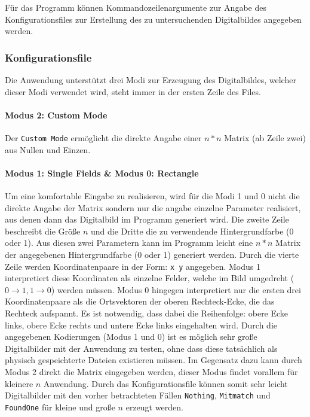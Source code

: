 Für das Programm können Kommandozeilenargumente zur Angabe des Konfigurationsfiles zur Erstellung des zu untersuchenden Digitalbildes angegeben werden.

\subsubsection{Konfigurationsfile}
Die Anwendung unterstützt drei Modi zur Erzeugung des Digitalbildes, welcher dieser Modi verwendet wird, steht immer in der ersten Zeile des Files.
\paragraph{Modus 2: Custom Mode}Der \texttt{Custom Mode} ermöglicht die direkte Angabe einer $n*n$ Matrix (ab Zeile zwei) aus Nullen und Einzen.
\paragraph{Modus 1: Single Fields \& Modus 0: Rectangle}
Um eine komfortable Eingabe zu realisieren, wird für die Modi 1 und 0 nicht die direkte Angabe der Matrix sondern nur die angabe einzelne Parameter realisiert, aus denen dann das Digitalbild im Programm generiert wird.
Die zweite Zeile beschreibt die Größe $n$ und die Dritte die zu verwendende Hintergrundfarbe (0 oder 1). 
Aus diesen zwei Parametern kann im Programm leicht eine $n*n$ Matrix der angegebenen Hintergrundfarbe (0 oder 1) generiert werden.
Durch die vierte Zeile werden Koordinatenpaare in der Form: \texttt{x y} angegeben. Modus 1 interpretiert diese Koordinaten als einzelne Felder, welche im Bild umgedreht \linebreak ($0 \rightarrow 1,1 \rightarrow 0$) werden müssen. 
Modus 0 hingegen interpretiert nur die ersten drei Koordinatenpaare als die Ortsvektoren der oberen Rechteck-Ecke, die das Rechteck aufspannt. 
Es ist notwendig, dass dabei die Reihenfolge: obere Ecke links, obere Ecke rechts und untere Ecke links eingehalten wird.
Durch die angegebenen Kodierungen (Modus 1 und 0) ist es möglich sehr große Digitalbilder mit der Anwendung zu testen, ohne dass diese tatsächlich  als physisch gespeichterte Dateien existieren müssen. 
Im Gegensatz dazu kann durch Modus 2 direkt die Matrix eingegeben werden, dieser Modus findet vorallem für kleinere $n$ Anwendung. 
Durch das Konfigurationsfile können somit sehr leicht Digitalbilder mit den vorher betrachteten Fällen \texttt{Nothing}, \texttt{Mitmatch} und \texttt{FoundOne} für kleine und große $n$ erzeugt werden.
